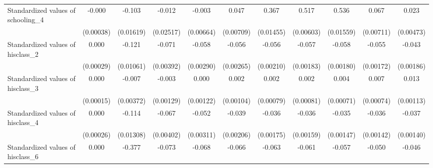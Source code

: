 {\begin{tabular}{l*{10}{c}}
Standardized values of schooling\_4&      -0.000         &      -0.103\sym{***}&      -0.012         &      -0.003         &       0.047\sym{***}&       0.367\sym{***}&       0.517\sym{***}&       0.536\sym{***}&       0.067\sym{***}&       0.023\sym{***}\\
                    &   (0.00038)         &   (0.01619)         &   (0.02517)         &   (0.00664)         &   (0.00709)         &   (0.01455)         &   (0.00603)         &   (0.01559)         &   (0.00711)         &   (0.00473)         \\
Standardized values of hisclass\_2&       0.000         &      -0.121\sym{***}&      -0.071\sym{***}&      -0.058\sym{***}&      -0.056\sym{***}&      -0.056\sym{***}&      -0.057\sym{***}&      -0.058\sym{***}&      -0.055\sym{***}&      -0.043\sym{***}\\
                    &   (0.00029)         &   (0.01061)         &   (0.00392)         &   (0.00290)         &   (0.00265)         &   (0.00210)         &   (0.00183)         &   (0.00180)         &   (0.00172)         &   (0.00186)         \\
Standardized values of hisclass\_3&       0.000         &      -0.007\sym{*}  &      -0.003\sym{*}  &       0.000         &       0.002         &       0.002\sym{**} &       0.002\sym{**} &       0.004\sym{***}&       0.007\sym{***}&       0.013\sym{***}\\
                    &   (0.00015)         &   (0.00372)         &   (0.00129)         &   (0.00122)         &   (0.00104)         &   (0.00079)         &   (0.00081)         &   (0.00071)         &   (0.00074)         &   (0.00113)         \\
Standardized values of hisclass\_4&       0.000         &      -0.114\sym{***}&      -0.067\sym{***}&      -0.052\sym{***}&      -0.039\sym{***}&      -0.036\sym{***}&      -0.036\sym{***}&      -0.035\sym{***}&      -0.036\sym{***}&      -0.037\sym{***}\\
                    &   (0.00026)         &   (0.01308)         &   (0.00402)         &   (0.00311)         &   (0.00206)         &   (0.00175)         &   (0.00159)         &   (0.00147)         &   (0.00142)         &   (0.00140)         \\
Standardized values of hisclass\_6&       0.000         &      -0.377\sym{***}&      -0.073\sym{***}&      -0.068\sym{***}&      -0.066\sym{***}&      -0.063\sym{***}&      -0.061\sym{***}&      -0.057\sym{***}&      -0.050\sym{***}&      -0.046\sym{***}\\

\end{tabular}}
